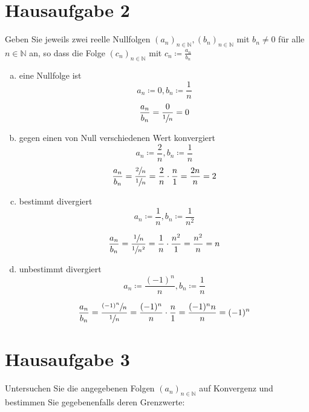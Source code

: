 \documentclass{article}
\begin{document}
\newpage
\section*{Hausaufgabe 2}

Geben Sie jeweils zwei reelle Nullfolgen $(a_n)_{n \in \mathbb{N}}, (b_n)_{n \in \mathbb{N}}$ mit $b_n \ne 0$ für
alle $n \in \mathbb{N}$ an, so dass die Folge $(c_n)_{n \in \mathbb{N}}$ mit $c_n \coloneqq \frac{a_n}{b_n}$

\begin{enumerate}[a)]
\item eine Nullfolge ist
  \[
    a_n \coloneqq 0, b_n \coloneqq \frac{1}{n}
  \]
  \[
    \frac{a_n}{b_n} = \frac{0}{\sfrac{1}{n}} = 0 
  \]
  
\item gegen einen von Null verschiedenen Wert konvergiert
  \[
    a_n \coloneqq \frac{2}{n}, b_n \coloneqq \frac{1}{n}
  \]
  \[
    \frac{a_n}{b_n} = \frac{\sfrac{2}{n}}{\sfrac{1}{n}} = \frac{2}{n} \cdot \frac{n}{1} = \frac{2n}{n} = 2
  \]
  
\item bestimmt divergiert
  \[
    a_n \coloneqq \frac{1}{n}, b_n \coloneqq \frac{1}{n^2}
  \]

  \[
    \frac{a_n}{b_n} = \frac{\sfrac{1}{n}}{\sfrac{1}{n^2}} = \frac{1}{n} \cdot \frac{n^2}{1} = \frac{n^2}{n} = n
  \]
  
\item unbestimmt divergiert
  \[
    a_n \coloneqq \frac{(-1)^n}{n}, b_n \coloneqq \frac{1}{n}
  \]

  \[
    \frac{a_n}{b_n} = \frac{\sfrac{(-1)^n}{n}}{\sfrac{1}{n}} = \frac{(-1)^n}{n} \cdot \frac{n}{1} = \frac{(-1)^nn}{n} = (-1)^n
  \]

  
\end{enumerate}

\newpage
\section*{Hausaufgabe 3}

Untersuchen Sie die angegebenen Folgen $(a_n)_{n \in \mathbb{N}}$ auf Konvergenz und bestimmen Sie gegebenenfalls deren
Grenzwerte:
\end{document}
